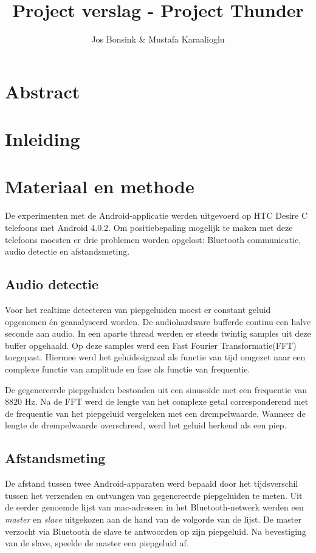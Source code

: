 \documentclass[12pt]{article}
\author{Jos Bonsink \& Mustafa Karaalioglu}
\begin{document}
\title{Project verslag - Project Thunder}
\maketitle

\section{Abstract}

\section{Inleiding}

\section{Materiaal en methode}
De experimenten met de Android-applicatie werden uitgevoerd op HTC Desire C telefoons met Android 4.0.2. Om positiebepaling mogelijk te maken met deze telefoons moesten er drie problemen worden opgelost: Bluetooth communicatie, audio detectie en afstandsmeting.

\subsection{Audio detectie}
Voor het realtime detecteren van piepgeluiden moest er constant geluid opgenomen \'en geanalyseerd worden.
De audiohardware bufferde continu een halve seconde aan audio. In een aparte thread werden er steeds twintig samples uit deze buffer opgehaald. Op deze samples werd een Fast Fourier Transformatie(FFT) toegepast. Hiermee werd het geluidssignaal als functie van tijd omgezet naar een complexe functie van amplitude en fase als functie van frequentie. 

De gegenereerde piepgeluiden bestonden uit een sinuso\"ide met een frequentie van $8820$ Hz. Na de FFT werd de lengte van het complexe getal corresponderend met de frequentie van het piepgeluid vergeleken met een drempelwaarde. Wanneer de lengte de drempelwaarde overschreed, werd het geluid herkend als een piep.

\subsection{Afstandsmeting}
De afstand tussen twee Android-apparaten werd bepaald door het tijdsverschil tussen het verzenden en ontvangen van gegenereerde piepgeluiden te meten. Uit de eerder genoemde lijst van mac-adressen in het Bluetooth-netwerk werden een \textit{master} en \textit{slave} uitgekozen aan de hand van de volgorde van de lijst. De master verzocht via Bluetooth de slave te antwoorden op zijn piepgeluid. Na bevestiging van de slave, speelde de master een piepgeluid af.
\end{document}
